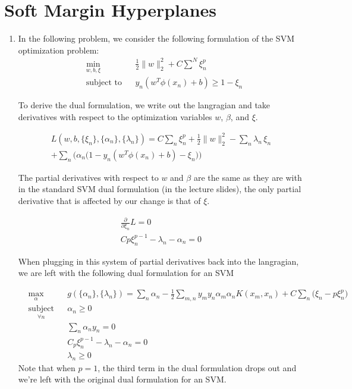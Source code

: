 \documentclass[12pt]{article}
\begin{document}
\section{Soft Margin Hyperplanes}
\begin{enumerate}[label=\alph*.]
	\item In the following problem, we consider the following formulation of the SVM optimization problem:
	\begin{equation*}
	\begin{aligned}
	& \underset{w, b, \xi}{\text{min}}
	& & \frac{1}{2} \lVert w \rVert^2_2 + C \sum^N{\xi_n^p} \\
	& \text{subject to}
	& & y_n(w^T \phi(x_n) + b) \geq 1 - \xi_n
	\end{aligned}
	\end{equation*}
	
	To derive the dual formulation, we write out the langragian and take derivatives with respect to the optimization variables $w$, $\beta$, and $\xi$.
	
	\begin{gather*}
		L(w, b, \{ \xi_n \}, \{ \alpha_n \}, \{ \lambda_n \}) = C \sum_n{\xi_n^p} + \frac{1}{2} \lVert w \rVert^2_2 - \sum_n{\lambda_n \, \xi_n} \\
										 + \sum_n{ \bigg( \alpha_n \big( 1 - y_n(w^T \phi(x_n) + b) - \xi_n \big)  \bigg) } 
	\end{gather*}
	
	The partial derivatives with respect to $w$ and $\beta$ are the same as they are with in the standard SVM dual formulation (in the lecture slides), the only partial derivative that is affected by our change is that of $\xi$.
	
	\begin{gather*}
		\frac{ \partial }{ \partial \xi_n } L = 0 \\
		Cp\xi_n^{p-1} - \lambda_n - \alpha_n = 0
	\end{gather*}
	
	When plugging in this system of partial derivatives back into the langragian, we are left with the following dual formulation for an SVM
	
	\begin{equation*}
	\begin{aligned}
	& \underset{\alpha}{\text{max}} 
	& & g ( \{ \alpha_n \}, \{ \lambda_n \} ) = \sum_n{\alpha_n} - \frac{1}{2} \sum_{m, n}{ y_m y_n \alpha_m \alpha_n K(x_m, x_n)} + C \sum_n{ \big( \xi_n - p \xi_n^p \big) } \\
	& \underset{\forall n}{\text{subject to}}
	& & \alpha_n \geq 0 \\
	& & & \sum_n{\alpha_n y_n} = 0 \\
	& & & C_p \xi_n^{p-1} - \lambda_n - \alpha_n = 0 \\
	& & & \lambda_n \geq 0 
	\end{aligned}
	\end{equation*}
	Note that when $p = 1$, the third term in the dual formulation drops out and we're left with the original dual formulation for an SVM.
	

\end{enumerate}
\end{document}
